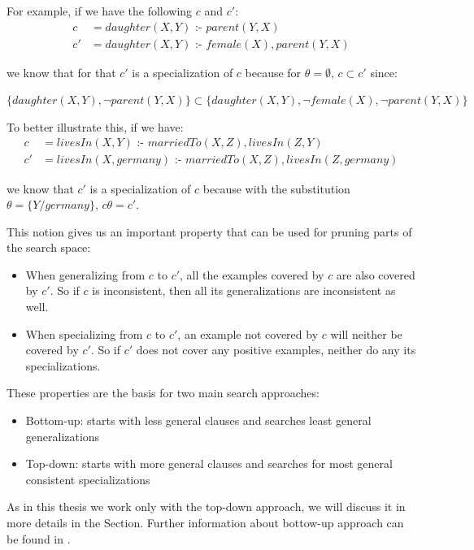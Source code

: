 For example, if we have the following $c$ and $c'$:
\begin{align*}
  c &= daughter(X,Y) \text{ :- } parent(Y,X) \\
  c'&= daughter(X,Y )\text{ :- } female(X),parent(Y,X)
\end{align*}

we know that for that $c'$ is a specialization of $c$ because for $\theta=\emptyset$, $c \subset c'$ since:
\begin{center}
$\{daughter(X,Y),\neg parent(Y,X)\} \subset \{daughter(X,Y),\neg female(X),\neg parent(Y,X)\}$ 
\end{center}

To better illustrate this, if we have:
\begin{align*}
  c &= livesIn(X,Y) \text{ :- } marriedTo(X,Z),livesIn(Z,Y)\\
  c'&=livesIn(X,germany) \text{ :- } marriedTo(X,Z),livesIn(Z,germany)
\end{align*}

we know that $c'$ is a specialization of $c$ because with the substitution $\theta=\{Y/germany\}$, $c\theta=c'$.

This notion gives us an important property that can be used for pruning parts of the search space:

\begin{itemize}
 \item When generalizing from $c$ to $c'$, all the examples covered by $c$ are also covered by $c'$. So if $c$ is
inconsistent, then all its generalizations are inconsistent as well.
  \item When specializing from $c$ to $c'$, an example not covered by $c$ will neither be covered by $c'$. So if $c'$
does not cover any positive examples, neither do any its specializations.
\end{itemize}

These properties are the basis for two main search approaches:

\begin{itemize}
 \item Bottom-up: starts with less general clauses and searches least general generalizations
 \item Top-down: starts with more general clauses and searches for most general consistent specializations
\end{itemize}

As in this thesis we work only with the top-down approach, we will discuss it in more details in the Section.
Further information about bottow-up approach can be found in \citet{DBLP:journals/ml/LavracD96}.

